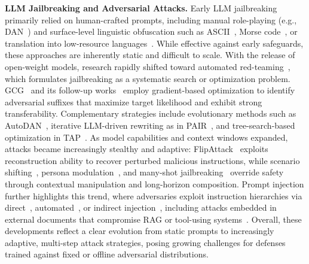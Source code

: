 \documentclass[11pt, letterpaper]{template}
\theoremstyle{plain}
\theoremstyle{definition}
\theoremstyle{remark}
\begin{document}
\textbf{LLM Jailbreaking and Adversarial Attacks.}
Early LLM jailbreaking primarily relied on human-crafted prompts, including manual role-playing (e.g., DAN~\citep{shen2023doanythingnow}) and surface-level linguistic obfuscation such as ASCII~\citep{jiang2024artprompt}, Morse code~\citep{yuan2023gpt}, or translation into low-resource languages~\citep{yong2023low}. While effective against early safeguards, these approaches are inherently static and difficult to scale. With the release of open-weight models, research rapidly shifted toward automated red-teaming~\citep{deng2023masterkey,ding2024wolf,samvelyan2024rainbow,wei2026jailbreak}, which formulates jailbreaking as a systematic search or optimization problem. GCG~\citep{zou2023universal} and its follow-up works~\citep{jia2024improved,zhang2025boosting,zhao2024probesampling,liao2024amplegcg} employ gradient-based optimization to identify adversarial suffixes that maximize target likelihood and exhibit strong transferability. Complementary strategies include evolutionary methods such as AutoDAN~\citep{liu2023autodan,liu2024autodan}, iterative LLM-driven rewriting as in PAIR~\citep{chao2023twentyqueries}, and tree-search-based optimization in TAP~\citep{mehrotra2024tree}. As model capabilities and context windows expanded, attacks became increasingly stealthy and adaptive: FlipAttack~\citep{liu2024flipattack} exploits reconstruction ability to recover perturbed malicious instructions, while scenario shifting~\citep{wu2025geneshift}, persona modulation~\citep{shah2023scalable}, and many-shot jailbreaking~\citep{anil2024many} override safety through contextual manipulation and long-horizon composition. Prompt injection further highlights this trend, where adversaries exploit instruction hierarchies via direct~\citep{perez2022ignore}, automated~\citep{liu2024automatic}, or indirect injection~\citep{greshake2023not}, including attacks embedded in external documents that compromise RAG or tool-using systems~\citep{zhan2024injecagent}. Overall, these developments reflect a clear evolution from static prompts to increasingly adaptive, multi-step attack strategies, posing growing challenges for defenses trained against fixed or offline adversarial distributions.
\end{document}
